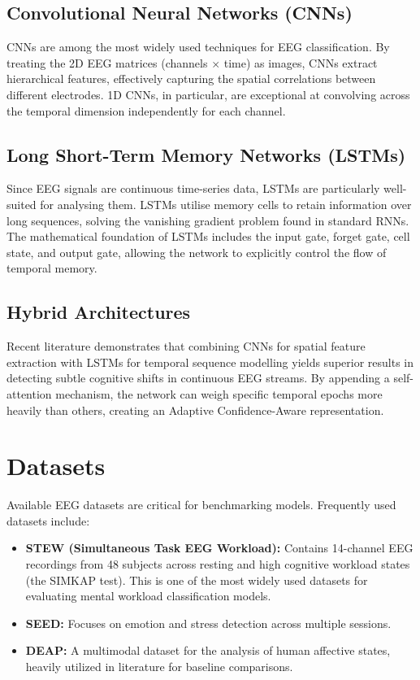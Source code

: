 \documentclass[12pt, a4paper]{article}
\begin{document}
\subsection{Convolutional Neural Networks (CNNs)}
CNNs are among the most widely used techniques for EEG classification. By treating the 2D EEG matrices (channels $\times$ time) as images, CNNs extract hierarchical features, effectively capturing the spatial correlations between different electrodes. 1D CNNs, in particular, are exceptional at convolving across the temporal dimension independently for each channel.

\subsection{Long Short-Term Memory Networks (LSTMs)}
Since EEG signals are continuous time-series data, LSTMs are particularly well-suited for analysing them. LSTMs utilise memory cells to retain information over long sequences, solving the vanishing gradient problem found in standard RNNs. The mathematical foundation of LSTMs includes the input gate, forget gate, cell state, and output gate, allowing the network to explicitly control the flow of temporal memory.

\subsection{Hybrid Architectures}
Recent literature demonstrates that combining CNNs for spatial feature extraction with LSTMs for temporal sequence modelling yields superior results in detecting subtle cognitive shifts in continuous EEG streams. By appending a self-attention mechanism, the network can weigh specific temporal epochs more heavily than others, creating an Adaptive Confidence-Aware representation.

\section{Datasets}
Available EEG datasets are critical for benchmarking models. Frequently used datasets include:
\begin{itemize}
    \item \textbf{STEW (Simultaneous Task EEG Workload):} Contains 14-channel EEG recordings from 48 subjects across resting and high cognitive workload states (the SIMKAP test). This is one of the most widely used datasets for evaluating mental workload classification models.
    \item \textbf{SEED:} Focuses on emotion and stress detection across multiple sessions.
    \item \textbf{DEAP:} A multimodal dataset for the analysis of human affective states, heavily utilized in literature for baseline comparisons.
\end{itemize}
\end{document}
